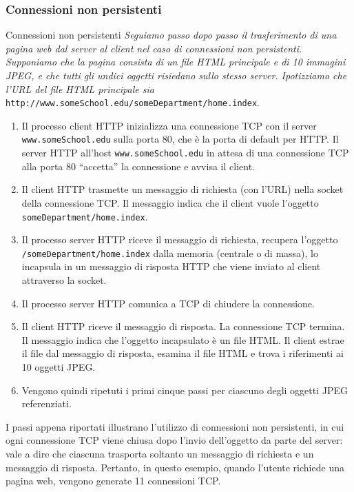 \subsubsection{Connessioni non persistenti}
\begin{Example}{Connessioni non persistenti}{}
    \textit{Seguiamo passo dopo passo il trasferimento di una pagina web dal server al client nel caso di connessioni non persistenti. Supponiamo che la pagina consista di un file HTML principale e di 10 immagini JPEG, e che tutti gli undici oggetti risiedano sullo stesso server. Ipotizziamo che l'URL del file HTML principale sia} \verb|http://www.someSchool.edu/someDepartment/home.index|.

    \begin{enumerate}
        \item Il processo client HTTP inizializza una connessione TCP con il server \verb|www.someSchool.edu| sulla porta 80, che è la porta di default per HTTP.
        Il server HTTP all'host \verb|www.someSchool.edu| in attesa di una connessione TCP alla porta 80 “accetta” la connessione e avvisa il client.
        \item Il client HTTP trasmette un messaggio di richiesta (con l'URL) nella socket della connessione TCP. Il messaggio indica che il client vuole l'oggetto \verb|someDepartment/home.index|.
        \item Il processo server HTTP riceve il messaggio di richiesta, recupera l'oggetto \verb|/someDepartment/home.index| dalla memoria (centrale o di massa), lo incapsula in un messaggio di risposta HTTP che viene inviato al client attraverso la socket.
        \item Il processo server HTTP comunica a TCP di chiudere la connessione.
        \item Il client HTTP riceve il messaggio di risposta. La connessione TCP termina. Il messaggio indica che l'oggetto incapsulato è un file HTML. Il client estrae il file dal messaggio di risposta, esamina il file HTML e trova i riferimenti ai 10 oggetti JPEG.
        \item Vengono quindi ripetuti i primi cinque passi per ciascuno degli oggetti JPEG referenziati.
    \end{enumerate}
\end{Example}

I passi appena riportati illustrano l'utilizzo di connessioni non persistenti, in cui ogni connessione TCP viene chiusa dopo l'invio dell'oggetto da parte del server: vale a dire che ciascuna trasporta soltanto un messaggio di richiesta e un messaggio di risposta. Pertanto, in questo esempio, quando l'utente richiede una pagina web, vengono generate 11 connessioni TCP. 

